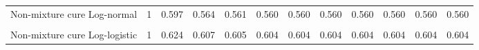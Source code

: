 \documentclass[
]{article}
\begin{document}
\begin{table}[H]
{\begin{tabular}[t]{lrrrrrrrrrrr}
Non-mixture cure Log-normal & 1 & 0.597 & 0.564 & 0.561 & 0.560 & 0.560 & 0.560 & 0.560 & 0.560 & 0.560 & 0.560\\
\cellcolor{gray!10}{Mixture cure Log-logistic} & \cellcolor{gray!10}{1} & \cellcolor{gray!10}{0.624} & \cellcolor{gray!10}{0.606} & \cellcolor{gray!10}{0.604} & \cellcolor{gray!10}{0.604} & \cellcolor{gray!10}{0.604} & \cellcolor{gray!10}{0.603} & \cellcolor{gray!10}{0.603} & \cellcolor{gray!10}{0.603} & \cellcolor{gray!10}{0.603} & \cellcolor{gray!10}{0.603}\\
Non-mixture cure Log-logistic & 1 & 0.624 & 0.607 & 0.605 & 0.604 & 0.604 & 0.604 & 0.604 & 0.604 & 0.604 & 0.604\\
\bottomrule
\end{tabular}}
\end{table}
\end{document}
